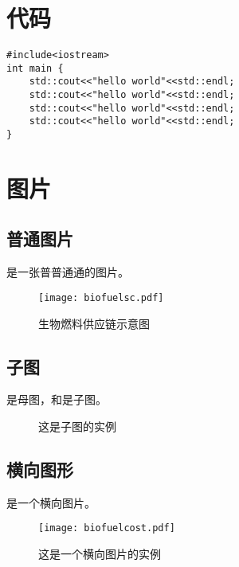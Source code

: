 \section{代码}
\begin{spacing}{1}
\begin{verbatim}
#include<iostream>
int main {
    std::cout<<"hello world"<<std::endl;
    std::cout<<"hello world"<<std::endl;
    std::cout<<"hello world"<<std::endl;
    std::cout<<"hello world"<<std::endl;
}
\end{verbatim}
\end{spacing}

\section{图片}
\subsection{普通图片}
是一张普普通通的图片。
\begin{figure}[htbp]
	\centering
	\texttt{[image: biofuelsc.pdf]}
	\caption{生物燃料供应链示意图}
	\label{fig:figure}
\end{figure}

\subsection{子图}
是母图，和是子图。
\begin{figure*}[ht]
	\centering
	\caption{这是子图的实例}
	\label{fig:subfig}
\end{figure*}

\subsection{横向图形}
 是一个横向图片。
\begin{landscape}
	\begin{figure}
		\centering
		\texttt{[image: biofuelcost.pdf]}
		\caption{这是一个横向图片的实例}
		\label{fig:landscapefig}
	\end{figure}
\end{landscape}

\cleardoublepage